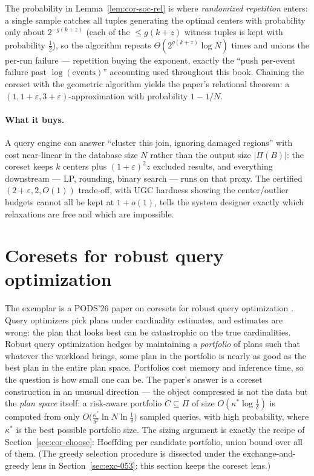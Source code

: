 The probability in Lemma~\ref{lem:cor-soc-rel} is where
\emph{randomized repetition} enters: a single sample catches all tuples
generating the optimal centers with probability only about
$2^{-g(k+z)}$ (each of the $\le g(k+z)$ witness tuples is kept with
probability $\tfrac12$), so the algorithm repeats
$\Theta(2^{g(k+z)} \log N)$ times and unions the per-run failure ---
repetition buying the exponent, exactly the ``push per-event failure
past $\log(\text{events})$'' accounting used throughout this book.
Chaining the coreset with the geometric algorithm yields the paper's
relational theorem: a $(1, 1+\varepsilon, 3+\varepsilon)$-approximation
with probability $1 - 1/N$.

\paragraph{What it buys.}
A query engine can answer ``cluster this join, ignoring damaged
regions'' with cost near-linear in the database size $N$ rather than
the output size $|\Pi(B)|$: the coreset keeps $k$ centers plus
$(1+\varepsilon)^2 z$ excluded results, and everything downstream ---
LP, rounding, binary search --- runs on that proxy. The certified
$(2+\varepsilon,2,O(1))$ trade-off, with UGC hardness showing the
center/outlier budgets cannot all be kept at $1+o(1)$, tells the system
designer exactly which relaxations are free and which are impossible.

\section{Coresets for robust query optimization}
\label{sec:cor-qo}

The exemplar is a PODS'26 paper on coresets for robust query
optimization \citep{sigmod26-053}\pods. Query optimizers pick plans
under cardinality estimates, and estimates are wrong: the plan that
looks best can be catastrophic on the true cardinalities. Robust query
optimization hedges by maintaining a \emph{portfolio} of plans such that
whatever the workload brings, some plan in the portfolio is nearly as
good as the best plan in the entire plan space. Portfolios cost memory
and inference time, so the question is how small one can be. The
paper's answer is a coreset construction in an unusual direction --- the
object compressed is not the data but the \emph{plan space} itself: a
risk-aware portfolio $C \subseteq \Pi$ of size
$O(\kappa^* \log\frac1\delta)$ is computed from only
$O\bigl(\frac{\kappa^*}{\delta^2}\ln N\ln\frac1\delta\bigr)$ sampled
queries, with high probability, where $\kappa^*$ is the best possible
portfolio size. The sizing argument is exactly the recipe of
Section~\ref{sec:cor-choose}: Hoeffding per candidate portfolio, union
bound over all of them. (The greedy selection procedure is dissected
under the exchange-and-greedy lens in Section~\ref{sec:exc-053}; this
section keeps the coreset lens.)

